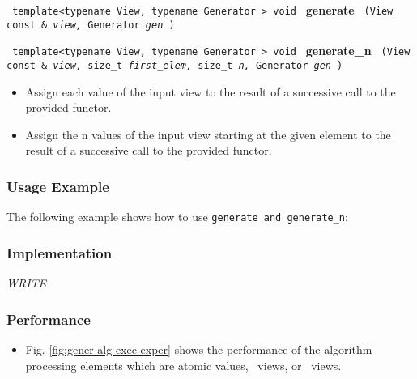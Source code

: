 \noindent
\texttt{%
template<typename View, typename Generator >
\newline
void 
}
\newline
\textbf{generate}%
\texttt{%
(View const \&
\textit{view,}%
Generator 
\textit{gen}%
)
}
\vspace{0.4cm}

\noindent
\texttt{%
template<typename View, typename Generator >
\newline
void 
}
\newline
\textbf{generate\_n}%
\texttt{%
(View const \&
\textit{view,}%
size\_t 
\textit{first\_elem,}%
size\_t 
\textit{n,}%
Generator 
\textit{gen}%
)
}

\begin{itemize}
\item
Assign each value of the input view to the result of a successive call to the provided functor. 
\item
Assign the n values of the input view starting at the given element to the result of a successive call to the provided functor. 
\end{itemize}
 
\subsubsection{Usage Example} %

The following example shows how to use \texttt{generate and generate\_n}:

 
\subsubsection{Implementation} %

\textit{WRITE}

\subsubsection{Performance} %

\begin{itemize}
\item
Fig. \ref{fig:gener-alg-exec-exper}
shows the performance of the algorithm processing
elements which are atomic values, \stl\ views, or \stapl\ views.
\end{itemize}

